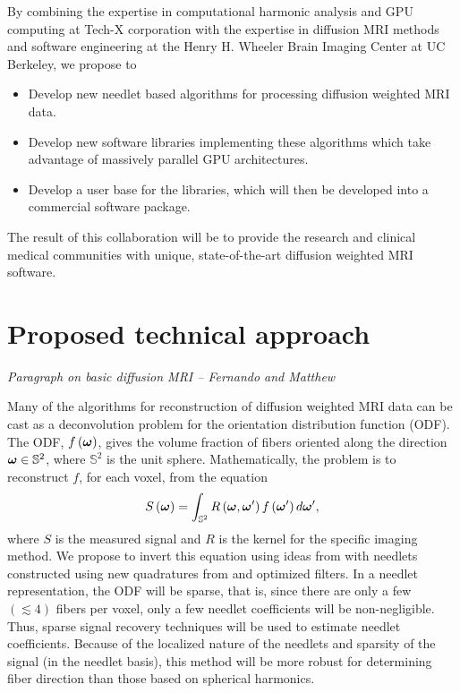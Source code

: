 \documentclass[10pt]{article}
\begin{document}
By combining the expertise in computational harmonic analysis and GPU computing at Tech-X corporation with the expertise in diffusion MRI methods and software engineering at the Henry H. Wheeler Brain Imaging Center at UC Berkeley, we propose to  
\begin{itemize}
  \item{Develop new needlet based algorithms for processing diffusion weighted MRI data.}
  \item{Develop new software libraries implementing these algorithms which take advantage of massively parallel GPU architectures.}
  \item{Develop a user base for the libraries, which will then be developed into a commercial software package.}
\end{itemize}
The result of this collaboration will be to provide the research and clinical medical communities with unique, state-of-the-art diffusion weighted MRI software.

\section*{Proposed technical approach}
\emph{Paragraph on basic diffusion MRI -- Fernando and Matthew}

Many of the algorithms for reconstruction of diffusion weighted MRI data can be cast as a deconvolution problem for the orientation distribution function (ODF)\cite{JIA-VEM-2007}. The ODF, $f\left({\boldsymbol{\omega}}\right)$, gives the volume fraction of fibers oriented along the direction ${\boldsymbol{\omega}}\in\mathbb{S}^2$, where $\mathbb{S}^2$ is the unit sphere. Mathematically, the problem is to reconstruct $f$, for each voxel, from the equation
\begin{equation*}
  S\left({\boldsymbol{\omega}}\right) = \int_{\mathbb{S}^2} R\left({\boldsymbol{\omega}},{\boldsymbol{\omega}}'\right) f\left({\boldsymbol{\omega}}'\right)d{\boldsymbol{\omega}}',
\end{equation*}  
where $S$ is the measured signal and $R$ is the kernel for the specific imaging method. We propose to invert this equation using ideas from \cite{KE-NG-PI-2009} with needlets constructed using new quadratures from \cite{AHR-BEY-2009} and optimized filters. In a needlet representation, the ODF will be sparse, that is, since there are only a few $(\lesssim 4)$ fibers per voxel, only a few needlet coefficients will be non-negligible. Thus, sparse signal recovery techniques will be used to estimate needlet coefficients. Because of the localized nature of the needlets and sparsity of the signal (in the needlet basis), this method will be more robust for determining fiber direction than those based on spherical harmonics.
\end{document}
